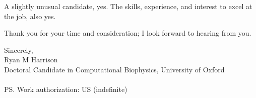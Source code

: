 \documentclass[a4paper]{../res}
\begin{document}
\begin{sloppypar}
\begin{resume}


A slightly unusual candidate, yes. The skills, experience, and interest to excel at the job, also yes. 

Thank you for your time and consideration; I look forward to hearing from you.

Sincerely,
\\
Ryan M Harrison \\
Doctoral Candidate in Computational Biophysics, University of Oxford \\  \\
PS. Work authorization: US (indefinite)

\end{resume} 
\end{sloppypar}
\end{document}
